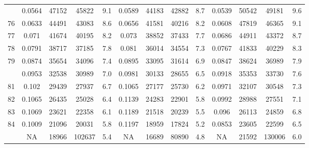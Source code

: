 \documentclass[
  14pt,
]{article}
\begin{document}
\begin{longtable}[t]{lcccccccccccc}
\addlinespace
75 & 0.0564 & 47152 & 45822 & 9.1 & 0.0589 & 44183 & 42882 & 8.7 & 0.0539 & 50542 & 49181 & 9.6\\
76 & 0.0633 & 44491 & 43083 & 8.6 & 0.0656 & 41581 & 40216 & 8.2 & 0.0608 & 47819 & 46365 & 9.1\\
77 & 0.071 & 41674 & 40195 & 8.2 & 0.073 & 38852 & 37433 & 7.7 & 0.0686 & 44911 & 43372 & 8.7\\
78 & 0.0791 & 38717 & 37185 & 7.8 & 0.081 & 36014 & 34554 & 7.3 & 0.0767 & 41833 & 40229 & 8.3\\
79 & 0.0874 & 35654 & 34096 & 7.4 & 0.0895 & 33095 & 31614 & 6.9 & 0.0847 & 38624 & 36989 & 7.9\\
\addlinespace
80 & 0.0953 & 32538 & 30989 & 7.0 & 0.0981 & 30133 & 28655 & 6.5 & 0.0918 & 35353 & 33730 & 7.6\\
81 & 0.102 & 29439 & 27937 & 6.7 & 0.1065 & 27177 & 25730 & 6.2 & 0.0971 & 32107 & 30548 & 7.3\\
82 & 0.1065 & 26435 & 25028 & 6.4 & 0.1139 & 24283 & 22901 & 5.8 & 0.0992 & 28988 & 27551 & 7.1\\
83 & 0.1069 & 23621 & 22358 & 6.1 & 0.1189 & 21518 & 20239 & 5.5 & 0.096 & 26113 & 24859 & 6.8\\
84 & 0.1009 & 21096 & 20031 & 5.8 & 0.1197 & 18959 & 17824 & 5.2 & 0.0853 & 23605 & 22599 & 6.5\\
\addlinespace
85 & NA & 18966 & 102637 & 5.4 & NA & 16689 & 80890 & 4.8 & NA & 21592 & 130006 & 6.0\\*
\end{longtable}
\end{document}
